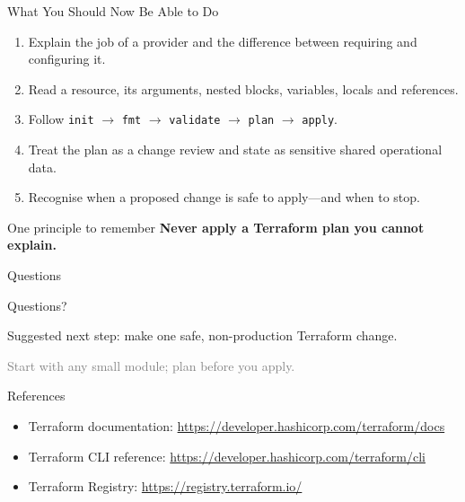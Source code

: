 \documentclass[aspectratio=169, xcolor=table]{beamer}
\begin{document}
\begin{frame}{What You Should Now Be Able to Do}
  \begin{enumerate}
    \item Explain the job of a provider and the difference between requiring and configuring it.
    \item Read a resource, its arguments, nested blocks, variables, locals and references.
    \item Follow \texttt{init} $\rightarrow$ \texttt{fmt} $\rightarrow$ \texttt{validate}
      $\rightarrow$ \texttt{plan} $\rightarrow$ \texttt{apply}.
    \item Treat the plan as a change review and state as sensitive shared operational data.
    \item Recognise when a proposed change is safe to apply---and when to stop.
  \end{enumerate}

  \vspace{1em}
  \begin{alertblock}{One principle to remember}
    \textbf{Never apply a Terraform plan you cannot explain.}
  \end{alertblock}
\end{frame}

\begin{frame}{Questions}
  \begin{center}
    \vspace{1.5em}
    \Huge \textcolor{PrimaryAccent}{Questions?}
    \vspace{1.5em}

    {\large Suggested next step: make one safe, non-production Terraform change.}
    \vspace{0.8em}

    {\small \textcolor{gray}{Start with any small module; plan before you apply.}}
  \end{center}
\end{frame}

\appendix

\begin{frame}[allowframebreaks]{References}
  \small
  \begin{itemize}
    \item Terraform documentation: \url{https://developer.hashicorp.com/terraform/docs}
    \item Terraform CLI reference: \url{https://developer.hashicorp.com/terraform/cli}
    \item Terraform Registry: \url{https://registry.terraform.io/}
  \end{itemize}
\end{frame}
\end{document}
